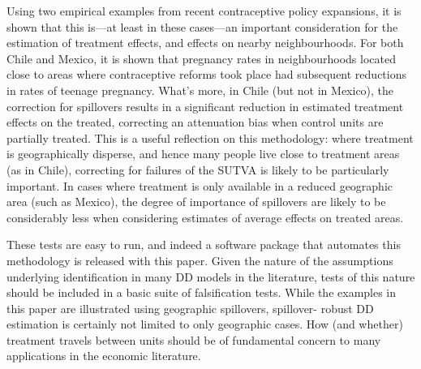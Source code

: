 \documentclass[12pt]{article}
\begin{document}
\begin{spacing}{1.3}
Using two empirical examples from recent contraceptive policy expansions, it is 
shown that this is---at least in these cases---an important consideration for 
the estimation of treatment effects, and effects on nearby neighbourhoods.  For
both Chile and Mexico, it is shown that pregnancy rates in neighbourhoods 
located close to areas where contraceptive reforms took place had subsequent
reductions in rates of teenage pregnancy.  What's more, in Chile (but not in 
Mexico), the correction for spillovers results in a significant reduction in
estimated treatment effects on the treated, correcting an attenuation bias when
control units are partially treated.  This is a useful reflection on this 
methodology: where treatment is geographically disperse, and hence many people
live close to treatment areas (as in Chile), correcting for failures of the
SUTVA is likely to be particularly important.  In cases where treatment is only
available in a reduced geographic area (such as Mexico), the degree of
importance of spillovers are likely to be considerably less when considering
estimates of average effects on treated areas.

These tests are easy to run, and indeed a software package that automates this
methodology is released with this paper.  Given the nature of the assumptions
underlying identification in many DD models in the literature, tests of this 
nature should be included in a basic suite of falsification tests.  While the
examples in this paper are illustrated using geographic spillovers, spillover-%
robust DD estimation is certainly not limited to only geographic cases.  How
(and whether) treatment travels between units should be of fundamental concern 
to many applications in the economic literature.
\newpage


\newpage

\begin{landscape}

\end{landscape}
\end{spacing}
\end{document}
